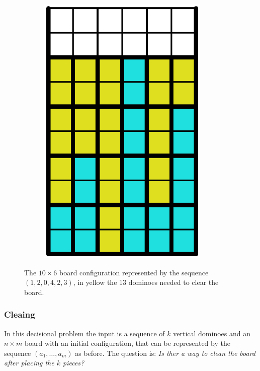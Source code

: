 \begin{figure}[ht]
\begin{subfigure}[b]{0.2\textwidth}
    \includegraphics[width=0.9\textwidth]{pictures/dominoes/vertical_configuration_filled.pdf}
    \caption{}
  \end{subfigure}
    \caption{The $10 \times 6 $ board configuration represented by the sequence $(1,2,0,4,2,3)$, in yellow the 13 dominoes needed to clear the board.}
  \label{dom:vconf}
\end{figure}

\subsubsection{Cleaing}

In this decisional problem the input is a sequence of $k$ vertical dominoes and an $n \times m$ board with an initial configuration, that can be represented by the sequence $(a_1, \dots, a_m)$ as before. The question is: \emph{Is ther a way to clean the board after placing the $k$ pieces?}


